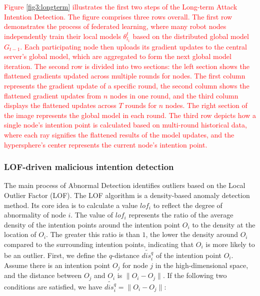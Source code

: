 \documentclass[lettersize,journal]{IEEEtran}
\begin{document}
\textcolor{red}{Figure \ref{fig3:longterm} illustrates the first two steps of the Long-term Attack Intention Detection. The figure comprises three rows overall. The first row demonstrates the process of federated learning, where many robot nodes independently train their local models \( \theta^t_{l_1} \) based on the distributed global model \( G_{t-1} \). Each participating node then uploads its gradient updates to the central server's global model, which are aggregated to form the next global model iteration. The second row is divided into two sections: the left section shows the flattened gradients updated across multiple rounds for nodes. The first column represents the gradient update of a specific round, the second column shows the flattened gradient updates from \( n \) nodes in one round, and the third column displays the flattened updates across \( T \) rounds for \( n \) nodes. The right section of the image represents the global model in each round. The third row depicts how a single node's intention point is calculated based on multi-round historical data, where each ray signifies the flattened results of the model updates, and the hypersphere's center represents the current node's intention point.}

\subsubsection{LOF-driven malicious intention detection}
The main process of Abnormal Detection identifies outliers based on the Local Outlier Factor (LOF). The LOF algorithm is a density-based anomaly detection method. Its core idea is to calculate a value $lof_i$ to reflect the degree of abnormality of node $i$. The value of $lof_i$ represents the ratio of the average density of the intention points around the intention point $O_i$ to the density at the location of $O_i$. The greater this ratio is than $1$, the lower the density around $O_i$ compared to the surrounding intention points, indicating that $O_i$ is more likely to be an outlier. First, we define the $q$-distance $\widetilde{dis_i^q}$ of the intention point $O_i$. Assume there is an intention point $O_j$ for node $j$ in the high-dimensional space, and the distance between $O_j$ and $O_i$ is $\|O_i-O_j\|$. If the following two conditions are satisfied, we have $\widetilde{dis_i^q} = \|O_i-O_j\|$:
\end{document}
